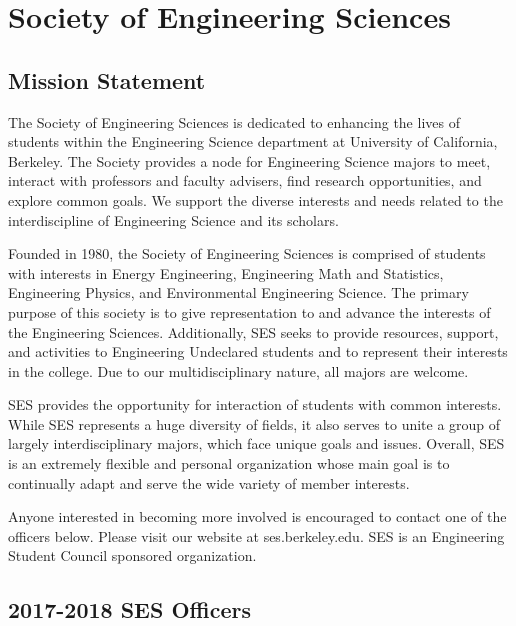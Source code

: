 \chapter*{Society of Engineering Sciences}

\textit{}

\section*{Mission Statement}

The Society of Engineering Sciences is dedicated to enhancing the lives of students within the Engineering Science department at University of California, Berkeley. The Society provides a node for Engineering Science majors to meet, interact with professors and faculty advisers, find research opportunities, and explore common goals. We support the diverse interests and needs related to the interdiscipline of Engineering Science and its scholars.

Founded in 1980, the Society of Engineering Sciences is comprised of students with interests in Energy Engineering, Engineering Math and Statistics, Engineering Physics, and Environmental Engineering Science. The primary purpose of this society is to give representation to and advance the interests of the Engineering Sciences. Additionally, SES seeks to provide resources, support, and activities to Engineering Undeclared students and to represent their interests in the college. Due to our multidisciplinary nature, all majors are welcome.

SES provides the opportunity for interaction of students with common interests. While SES represents a huge diversity of fields, it also serves to unite a group of largely interdisciplinary majors, which face unique goals and issues. Overall, SES is an extremely flexible and personal organization whose main goal is to continually adapt and serve the wide variety of member interests.

Anyone interested in becoming more involved is encouraged to contact one of the officers below. Please visit our website at ses.berkeley.edu. SES is an Engineering Student Council sponsored organization.

\section*{2017-2018 SES Officers}

